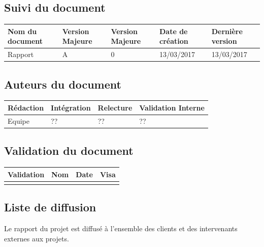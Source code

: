 \documentclass[10pt,a4paper]{article}
\begin{document}
\newpage


\subsection*{Suivi du document}

\begin{center}
    \begin{tabular}{| l | l | l | l | l |}
    \hline
     \rowcolor{gray} Nom du document & Version Majeure & Version Majeure & Date de création & Dernière version \\ \hline
    Rapport & A & 0 & 13/03/2017 & 13/03/2017 \\ \hline
    \end{tabular}
\end{center}


\subsection*{Auteurs du document}

\begin{center}
    \begin{tabular}{| l | l | l | l |}
    \hline
    \rowcolor{gray} Rédaction & Intégration & Relecture & Validation Interne \\ \hline
    Equipe & ?? & ?? & ?? \\ \hline

    \end{tabular}
\end{center}

\subsection*{Validation du document}

\begin{center}
    \begin{tabular}{| l | l | l | l |}
    \hline
     \rowcolor{gray} Validation & Nom & Date & Visa \\ \hline
    & & & \\
     \hline
    \end{tabular}
\end{center}

\subsection*{Liste de diffusion}

Le rapport du projet est diffusé à l'ensemble des clients et des intervenants externes aux projets.
\end{document}
